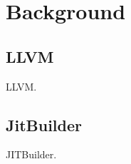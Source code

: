 \section{Background}
\label{sec:background}
\subsection{LLVM}
\label{sec:llvm}
LLVM.
\subsection{JitBuilder}
\label{sec:jitbuilder}
JITBuilder.